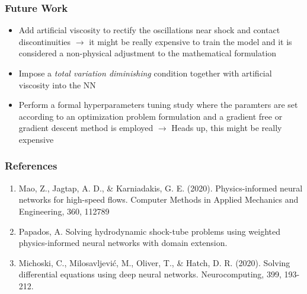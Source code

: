 \documentclass[aspectratio=169]{beamer}
\begin{document}
\begin{frame}\frametitle{Future Work}
	
	\begin{itemize}
		\item Add artificial viscosity to rectify the oscillations near shock and contact discontinuities $\rightarrow$ it might
		be really expensive to train the model and it is considered a non-physical adjustment to the mathematical formulation
		
		\item Impose a \textit{total variation diminishing} condition together with 
		artificial viscosity into the NN  
		
		\item Perform a formal hyperparameters tuning study where the paramters are set
		according to an optimization problem formulation and a gradient free or gradient descent method is employed $\rightarrow$ Heads up, this might be really expensive
		
	\end{itemize}
	
\end{frame}


\begin{frame}\frametitle{References}
	
	\begin{enumerate}
		\item Mao, Z., Jagtap, A. D., \& Karniadakis, G. E. (2020). Physics-informed neural networks for high-speed flows. Computer Methods in Applied Mechanics and Engineering, 360, 112789
		\item Papados, A. Solving hydrodynamic shock-tube problems using weighted physics-informed neural networks with domain extension.
		\item Michoski, C., Milosavljević, M., Oliver, T., \& Hatch, D. R. (2020). Solving differential equations using deep neural networks. Neurocomputing, 399, 193-212.
	\end{enumerate}
	
\end{frame}
\end{document}
